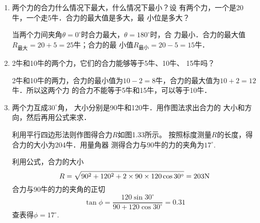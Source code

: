 \begin{enumerate}
\begin{solution}
\end{solution}
\item 两个力的合力什么情况下最大，什么情况下最小？设
有两个力，一个是20牛，一个走5牛．合力的最大值是多大，最
小位是多大？

\begin{solution}
    当两个力间夹角$\theta=0^{\circ}$时合力最大，$\theta=180^{\circ}$时，合
力最小．合力的最大值$R_{\text{最大}}=20+5=25$牛；合力的最
小值$R_{\text{最小}}=20-5=15$牛．
\end{solution}
\item 2牛和10牛的两个力，它们的合力能够等于5牛、10牛、
15牛吗？

\begin{solution}
    2牛和10牛的两力，合力的最小值为$10-2=8$牛，合力的最大值为$10+2=12$牛．所以这两个力
的合力不能等于5牛和15牛，可以等于10牛．
\end{solution}
\item   两个力互成$30^\circ$角， 大小分别是90牛和120牛．用作图法求出合力的
大小和方向，然后再用公式来求．

\begin{figure}[htp]
    \centering
{}
    \caption{}
\end{figure}


\begin{solution}
    利用平行四边形法则作图得合力$R$如图1.33所示。
按照标度测量$R$的长度，得合力的大小为204牛．用量角器
测得合力与90牛的力的夹角为$17^{\circ}$.

利用公式，合力的大小
\[R=\sqrt{90^2+120^2+2\times90\times120\cos30^{\circ}}=203{\rm N}\]
合力与90牛的力的夹角的正切
\[\tan\phi = \frac{120\sin 30^{\circ}}{90+120\cos30^{\circ}}=
0.31\]
查表得$\phi=17^{\circ}$.
\end{solution}
\end{enumerate}


